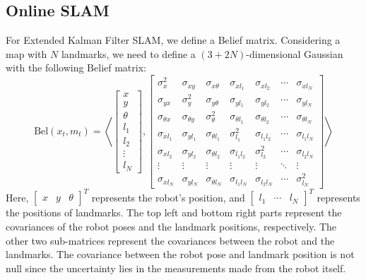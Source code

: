 \subsection{Online SLAM}

For Extended Kalman Filter SLAM, we define a Belief matrix. 
Considering a map with $N$ landmarks, we need to define a $(3+2N)$-dimensional Gaussian with the following Belief matrix:
\[\text{Bel}(x_t,m_t)=\left\langle \begin{bmatrix}
    x \\ y \\ \theta \\ l_1 \\ l_2 \\ \vdots \\ l_N
\end{bmatrix},\begin{bmatrix}
    \sigma_x^2 & \sigma_{xy} & \sigma_{x\theta} & \sigma_{xl_1} & \sigma_{xl_2} & \cdots & \sigma_{xl_N} \\
    \sigma_{yx} & \sigma_{y}^2 & \sigma_{y\theta} & \sigma_{yl_1} & \sigma_{yl_2} & \cdots & \sigma_{yl_N} \\
    \sigma_{\theta x} & \sigma_{\theta y} & \sigma_{\theta}^2 & \sigma_{\theta l_1} & \sigma_{\theta l_2} & \cdots & \sigma_{\theta l_N} \\
    \sigma_{xl_1} & \sigma_{yl_1} & \sigma_{\theta l_1} & \sigma_{l_1}^2 & \sigma_{l_1l_2} & \cdots & \sigma_{l_1l_N} \\
    \sigma_{xl_2} & \sigma_{yl_2} & \sigma_{\theta l_2} & \sigma_{l_1l_2} & \sigma_{l_2}^2 & \cdots & \sigma_{l_2l_N} \\
    \vdots & \vdots & \vdots & \vdots & \vdots & \ddots & \vdots \\
    \sigma_{xl_N} & \sigma_{yl_N} & \sigma_{\theta l_N} & \sigma_{l_1l_N} & \sigma_{l_2l_N}& \cdots & \sigma_{l_N}^2
\end{bmatrix}\right\rangle \]
Here, $\begin{bmatrix} x & y & \theta \end{bmatrix}^T$ represents the robot's position, and $\begin{bmatrix} l_1 & \cdots & l_N \end{bmatrix}^T$ represents the positions of landmarks.
The top left and bottom right parts represent the covariances of the robot poses and the landmark positions, respectively. 
The other two sub-matrices represent the covariances between the robot and the landmarks.
The covariance between the robot pose and landmark position is not null since the uncertainty lies in the measurements made from the robot itself.

